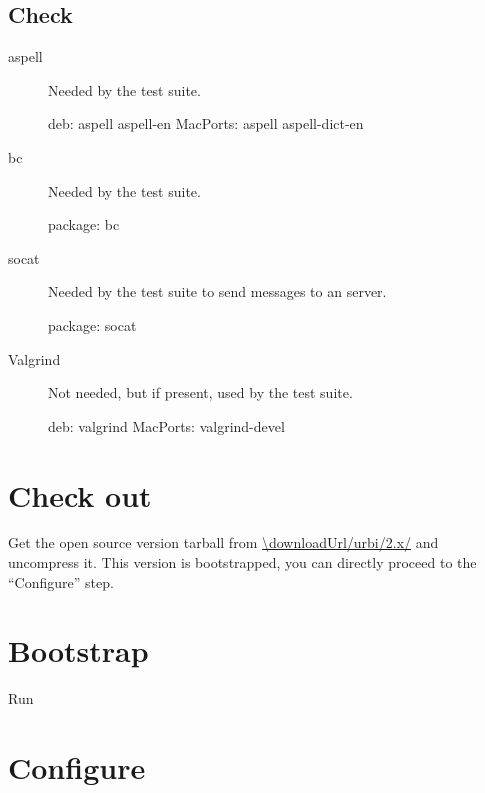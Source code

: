 \subsection{Check}
\label{sec:build:req:check}

\begin{description}
\item[aspell] Needed by the test suite.
\begin{package}
deb: aspell aspell-en
MacPorts: aspell aspell-dict-en
\end{package}

\item[bc]
  Needed by the test suite.
\begin{package}
package: bc
\end{package}

\item[socat] Needed by the test suite to send messages to an \urbi server.
\begin{package}
package: socat
\end{package}

\item[Valgrind] Not needed, but if present, used by the test suite.
\begin{package}
deb: valgrind
MacPorts: valgrind-devel
\end{package}

\end{description}



\section{Check out}

Get the open source version tarball from \url{\downloadUrl/urbi/2.x/} and
uncompress it.  This version is bootstrapped, you can directly proceed to
the ``Configure'' step.

\section{Bootstrap}
Run


\section{Configure}
\label{sec:build:configure}

